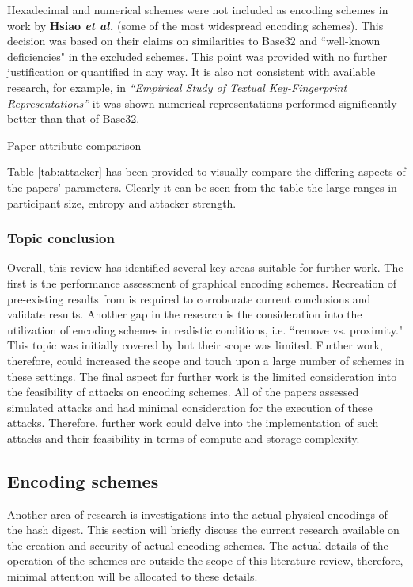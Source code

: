 Hexadecimal and numerical schemes were not included as encoding schemes in work by \textbf{Hsiao \textit{et al.}}\cite{hsiao2009study} (some of the most widespread encoding schemes). This decision was based on their claims on similarities to Base32 and ``well-known deficiencies" in the excluded schemes. This point was provided with no further justification or quantified in any way. It is also not consistent with available research, for example, in \textit{``Empirical Study of Textual Key-Fingerprint Representations''}\cite{dechand2016empirical} it was shown numerical representations performed significantly better than that of Base32.

\begin{table}[h!]
    \makebox[\textwidth][c]{
        
    }%
    \caption{Paper attribute comparison}
    \label{tab:attacker}
\end{table}

Table \ref{tab:attacker} has been provided to visually compare the differing aspects of the papers' parameters. Clearly it can be seen from the table the large ranges in participant size, entropy and attacker strength.

\subsubsection*{Topic conclusion}
Overall, this review has identified several key areas suitable for further work.
The first is the performance assessment of graphical encoding schemes. Recreation of pre-existing results from \cite{hsiao2009study}\cite{tan2017can} is required to corroborate current conclusions and validate results.
Another gap in the research is the consideration into the utilization of encoding schemes in realistic conditions, i.e. ``remove vs. proximity." This topic was initially covered by \cite{shirvanian2017pitfalls} but their scope was limited. Further work, therefore, could increased the scope and touch upon a large number of schemes in these settings.
The final aspect for further work is the limited consideration into the feasibility of attacks on encoding schemes. All of the papers assessed simulated attacks and had minimal consideration for the execution of these attacks. Therefore, further work could delve into the implementation of such attacks and their feasibility in terms of compute and storage complexity.

\subsection{Encoding schemes}
Another area of research is investigations into the actual physical encodings of the hash digest. This section will briefly discuss the current research available on the creation and security of actual encoding schemes. The actual details of the operation of the schemes are outside the scope of this literature review, therefore, minimal attention will be allocated to these details.

